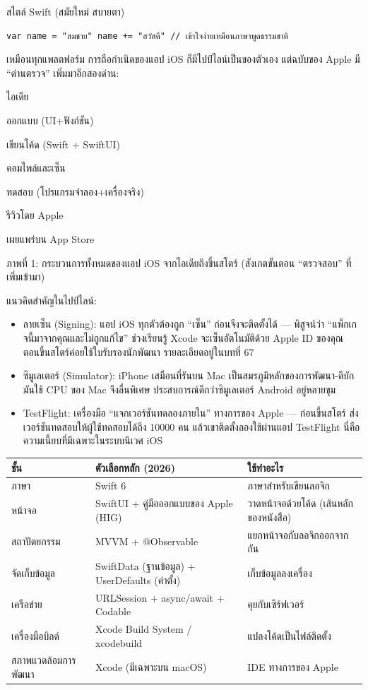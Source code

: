 สไตล์ Swift (สมัยใหม่ สบายตา)

\begin{lstlisting}
var name = "สมชาย" name += "สวัสดี" // เข้าใจง่ายเหมือนภาษาพูดธรรมชาติ
\end{lstlisting}


เหมือนทุกแพลตฟอร์ม การถือกำเนิดของแอป iOS ก็มีไปป์ไลน์เป็นของตัวเอง แต่ฉบับของ Apple มี “ด่านตรวจ” เพิ่มมาอีกสองด่าน:

ไอเดีย

ออกแบบ (UI+ฟังก์ชัน)

เขียนโค้ด (Swift + SwiftUI)

คอมไพล์และเซ็น

ทดสอบ (โปรแกรมจำลอง+เครื่องจริง)

รีวิวโดย Apple

เผยแพร่บน App Store

\begin{center}\small\color{gray}ภาพที่ 1: กระบวนการทั้งหมดของแอป iOS จากไอเดียถึงขึ้นสโตร์ (สังเกตขั้นตอน “ตรวจสอบ” ที่เพิ่มเข้ามา)\end{center}

แนวคิดสำคัญในไปป์ไลน์:

\begin{itemize}
  \item ลายเซ็น (Signing): แอป iOS ทุกตัวต้องถูก “เซ็น” ก่อนจึงจะติดตั้งได้ — พิสูจน์ว่า “แพ็กเกจนี้มาจากคุณและไม่ถูกแก้ไข” ช่วงเรียนรู้ Xcode จะเซ็นอัตโนมัติด้วย Apple ID ของคุณ ตอนขึ้นสโตร์ค่อยใช้ใบรับรองนักพัฒนา รายละเอียดอยู่ในบทที่ 67
  \item ซิมูเลเตอร์ (Simulator): iPhone เสมือนที่รันบน Mac เป็นสมรภูมิหลักของการพัฒนา-ดีบัก มันใช้ CPU ของ Mac จึงลื่นพิเศษ ประสบการณ์ดีกว่าซิมูเลเตอร์ Android อยู่หลายขุม
  \item TestFlight: เครื่องมือ “แจกเวอร์ชันทดลองภายใน” ทางการของ Apple — ก่อนขึ้นสโตร์ ส่งเวอร์ชันทดสอบให้ผู้ใช้ทดสอบได้ถึง 10000 คน แล้วเขาติดตั้งลองใช้ผ่านแอป TestFlight นี่คือความเนี้ยบที่มีเฉพาะในระบบนิเวศ iOS
\end{itemize}


\begin{center}
\begin{tabularx}{\linewidth}{|X|X|X|}
\hline
\textbf{ชั้น} & \textbf{ตัวเลือกหลัก (2026)} & \textbf{ใช้ทำอะไร} \tabularnewline
\hline
ภาษา & Swift 6 & ภาษาสำหรับเขียนลอจิก \tabularnewline
หน้าจอ & SwiftUI + คู่มือออกแบบของ Apple (HIG) & วาดหน้าจอด้วยโค้ด (เส้นหลักของหนังสือ) \tabularnewline
สถาปัตยกรรม & MVVM + @Observable & แยกหน้าจอกับลอจิกออกจากกัน \tabularnewline
จัดเก็บข้อมูล & SwiftData (ฐานข้อมูล) + UserDefaults (ค่าตั้ง) & เก็บข้อมูลลงเครื่อง \tabularnewline
เครือข่าย & URLSession + async/await + Codable & คุยกับเซิร์ฟเวอร์ \tabularnewline
เครื่องมือบิลด์ & Xcode Build System / xcodebuild & แปลงโค้ดเป็นไฟล์ติดตั้ง \tabularnewline
สภาพแวดล้อมการพัฒนา & Xcode (มีเฉพาะบน macOS) & IDE ทางการของ Apple \tabularnewline
\hline
\end{tabularx}
\end{center}

